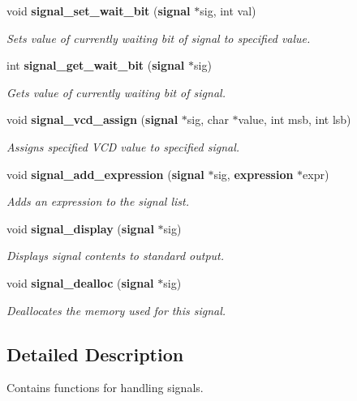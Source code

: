 \begin{CompactItemize}
void {\bf signal\_\-set\_\-wait\_\-bit} ({\bf signal} $\ast$sig, int val)
\begin{CompactList}\small\item\em Sets value of currently waiting bit of signal to specified value. \item\end{CompactList}\item 
int {\bf signal\_\-get\_\-wait\_\-bit} ({\bf signal} $\ast$sig)
\begin{CompactList}\small\item\em Gets value of currently waiting bit of signal. \item\end{CompactList}\item 
void {\bf signal\_\-vcd\_\-assign} ({\bf signal} $\ast$sig, char $\ast$value, int msb, int lsb)
\begin{CompactList}\small\item\em Assigns specified VCD value to specified signal. \item\end{CompactList}\item 
void {\bf signal\_\-add\_\-expression} ({\bf signal} $\ast$sig, {\bf expression} $\ast$expr)
\begin{CompactList}\small\item\em Adds an expression to the signal list. \item\end{CompactList}\item 
void {\bf signal\_\-display} ({\bf signal} $\ast$sig)
\begin{CompactList}\small\item\em Displays signal contents to standard output. \item\end{CompactList}\item 
void {\bf signal\_\-dealloc} ({\bf signal} $\ast$sig)
\begin{CompactList}\small\item\em Deallocates the memory used for this signal. \item\end{CompactList}\end{CompactItemize}


\subsection{Detailed Description}
Contains functions for handling signals. 

